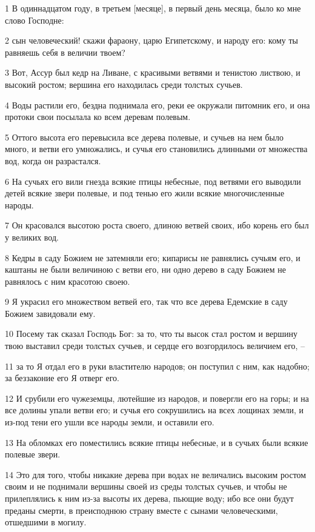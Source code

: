 \par 1 В одиннадцатом году, в третьем [месяце], в первый день месяца, было ко мне слово Господне:
\par 2 сын человеческий! скажи фараону, царю Египетскому, и народу его: кому ты равняешь себя в величии твоем?
\par 3 Вот, Ассур был кедр на Ливане, с красивыми ветвями и тенистою листвою, и высокий ростом; вершина его находилась среди толстых сучьев.
\par 4 Воды растили его, бездна поднимала его, реки ее окружали питомник его, и она протоки свои посылала ко всем деревам полевым.
\par 5 Оттого высота его перевысила все дерева полевые, и сучьев на нем было много, и ветви его умножались, и сучья его становились длинными от множества вод, когда он разрастался.
\par 6 На сучьях его вили гнезда всякие птицы небесные, под ветвями его выводили детей всякие звери полевые, и под тенью его жили всякие многочисленные народы.
\par 7 Он красовался высотою роста своего, длиною ветвей своих, ибо корень его был у великих вод.
\par 8 Кедры в саду Божием не затемняли его; кипарисы не равнялись сучьям его, и каштаны не были величиною с ветви его, ни одно дерево в саду Божием не равнялось с ним красотою своею.
\par 9 Я украсил его множеством ветвей его, так что все дерева Едемские в саду Божием завидовали ему.
\par 10 Посему так сказал Господь Бог: за то, что ты высок стал ростом и вершину твою выставил среди толстых сучьев, и сердце его возгордилось величием его, --
\par 11 за то Я отдал его в руки властителю народов; он поступил с ним, как надобно; за беззаконие его Я отверг его.
\par 12 И срубили его чужеземцы, лютейшие из народов, и повергли его на горы; и на все долины упали ветви его; и сучья его сокрушились на всех лощинах земли, и из-под тени его ушли все народы земли, и оставили его.
\par 13 На обломках его поместились всякие птицы небесные, и в сучьях были всякие полевые звери.
\par 14 Это для того, чтобы никакие дерева при водах не величались высоким ростом своим и не поднимали вершины своей из среды толстых сучьев, и чтобы не прилеплялись к ним из-за высоты их дерева, пьющие воду; ибо все они будут преданы смерти, в преисподнюю страну вместе с сынами человеческими, отшедшими в могилу.
